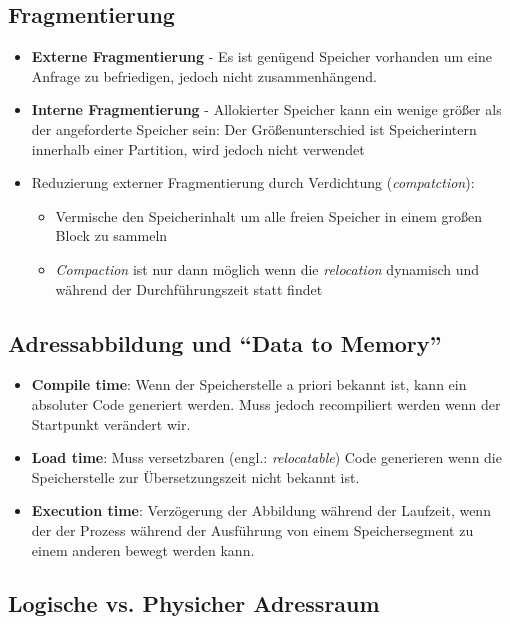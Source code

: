 \documentclass[a4paper]{scrreprt}
\begin{document}
\subsection{Fragmentierung}
\begin{itemize}
\item \textbf{Externe Fragmentierung} - Es ist genügend Speicher vorhanden um eine Anfrage zu befriedigen, jedoch nicht zusammenhängend.
\item \textbf{Interne Fragmentierung} - Allokierter Speicher kann ein wenige größer als der angeforderte Speicher sein: Der Größenunterschied ist Speicherintern innerhalb einer Partition, wird jedoch nicht verwendet
\item Reduzierung externer Fragmentierung durch Verdichtung (\textit{compatction}):
\begin{itemize}
\item Vermische den Speicherinhalt um alle freien Speicher in einem großen Block zu sammeln
\item \textit{Compaction} ist nur dann möglich wenn die \textit{relocation} dynamisch und während der Durchführungszeit statt findet

\end{itemize}
\end{itemize}
\subsection{Adressabbildung und "`Data to Memory"'}

\begin{itemize}
\item \textbf{Compile time}: Wenn der Speicherstelle  a priori bekannt ist, kann ein absoluter Code generiert werden. Muss jedoch recompiliert werden wenn der Startpunkt verändert wir.
\item \textbf{Load time}: Muss versetzbaren (engl.: \textit{relocatable}) Code generieren wenn die Speicherstelle zur Übersetzungszeit nicht bekannt ist.
\item \textbf{Execution time}: Verzögerung der Abbildung während der Laufzeit, wenn der der Prozess während der Ausführung von einem Speichersegment zu einem anderen bewegt werden kann. 
\end{itemize}

\subsection{Logische vs. Physicher Adressraum}
\end{document}

